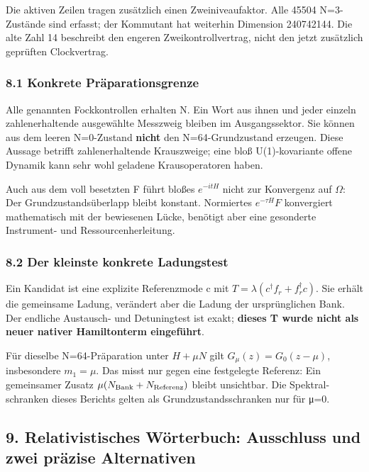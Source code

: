 Die aktiven Zeilen tragen zusätzlich einen Zweiniveaufaktor. Alle 45504
N=3-Zustände sind erfasst; der Kommutant hat weiterhin Dimension
240742144. Die alte Zahl 14 beschreibt den engeren Zweikontrollvertrag,
nicht den jetzt zusätzlich geprüften Clockvertrag.

\subsubsection{8.1 Konkrete
Präparationsgrenze}\label{konkrete-pruxe4parationsgrenze}

Alle genannten Fockkontrollen erhalten N. Ein Wort aus ihnen und jeder
einzeln zahlenerhaltende ausgewählte Messzweig bleiben im
Ausgangssektor. Sie können aus dem leeren N=0-Zustand \textbf{nicht} den
N=64-Grundzustand erzeugen. Diese Aussage betrifft zahlenerhaltende
Krauszweige; eine bloß U(1)-kovariante offene Dynamik kann sehr wohl
geladene Krausoperatoren haben.

Auch aus dem voll besetzten F führt bloßes \(e^{-itH}\) nicht zur
Konvergenz auf \(\Omega\): Der Grundzustandsüberlapp bleibt konstant.
Normiertes \(e^{-\tau H}F\) konvergiert mathematisch mit der bewiesenen
Lücke, benötigt aber eine gesonderte Instrument- und
Ressourcenherleitung.

\subsubsection{8.2 Der kleinste konkrete
Ladungstest}\label{der-kleinste-konkrete-ladungstest}

Ein Kandidat ist eine explizite Referenzmode c mit
\(T=\lambda(c^\dagger f_r+f_r^\dagger c)\). Sie erhält die gemeinsame
Ladung, verändert aber die Ladung der ursprünglichen Bank. Der endliche
Austausch- und Detuningtest ist exakt; \textbf{dieses T wurde nicht als
neuer nativer Hamiltonterm eingeführt}.

Für dieselbe N=64-Präparation unter \(H+\mu N\) gilt
\(G_\mu(z)=G_0(z-\mu)\), insbesondere \(m_1=\mu\). Das misst nur gegen
eine festgelegte Referenz: Ein gemeinsamer Zusatz
\(\mu(N_{\rm Bank}+N_{\rm Referenz})\) bleibt unsichtbar. Die Spektral-
schranken dieses Berichts gelten als Grundzustandsschranken nur für μ=0.

\subsection{9. Relativistisches Wörterbuch: Ausschluss und zwei präzise
Alternativen}\label{relativistisches-wuxf6rterbuch-ausschluss-und-zwei-pruxe4zise-alternativen}

